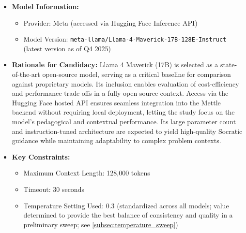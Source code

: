 \begin{itemize}
    \item \textbf{Model Information:} 
        \begin{itemize}
            \item Provider: Meta (accessed via Hugging Face Inference API)
            \item Model Version: \verb|meta-llama/Llama-4-Maverick-17B-128E-Instruct| (latest version as of Q4 2025)
        \end{itemize}
    \item \textbf{Rationale for Candidacy:} 
        Llama 4 Maverick (17B) is selected as a state-of-the-art open-source model, serving as a critical baseline for comparison against proprietary models. Its inclusion enables evaluation of cost-efficiency and performance trade-offs in a fully open-source context. Access via the Hugging Face hosted API ensures seamless integration into the Mettle backend without requiring local deployment, letting the study focus on the model's pedagogical and contextual performance. Its large parameter count and instruction-tuned architecture are expected to yield high-quality Socratic guidance while maintaining adaptability to complex problem contexts.
    \item \textbf{Key Constraints:}
        \begin{itemize}
            \item Maximum Context Length: 128,000 tokens
            \item Timeout: 30 seconds
            \item Temperature Setting Used: 0.3 (standardized across all models; value determined to provide the best balance of consistency and quality in a preliminary sweep; see \cref{subsec:temperature_sweep})
        \end{itemize}
\end{itemize}
